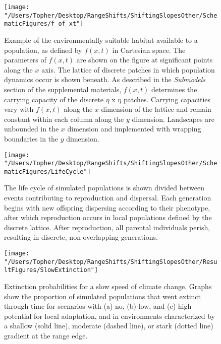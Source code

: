 \documentclass[11pt]{article}
\begin{document}
\begin{figure}[h!]
\texttt{[image: "/Users/Topher/Desktop/RangeShifts/ShiftingSlopesOther/SchematicFigures/f\_of\_xt"]}
\caption{Example of the environmentally suitable habitat available to a population, as defined by $f(x,t)$ in Cartesian space. The parameters of $f(x,t)$ are shown on the figure at significant points along the $x$ axis. The lattice of discrete patches in which population dynamics occur is shown beneath. As described in the \textit{Submodels} section of the supplemental materials, $f(x,t)$ determines the carrying capacity of the discrete $\eta$ x $\eta$ patches. Carrying capacities vary with $f(x,t)$ along the $x$ dimension of the lattice and remain constant within each column along the $y$ dimension. Landscapes are  unbounded in the $x$ dimension and implemented with wrapping boundaries in the $y$ dimension.}
\label{Fig:EnvFunction}
\end{figure}

\clearpage

\begin{figure}[h!]
\texttt{[image: "/Users/Topher/Desktop/RangeShifts/ShiftingSlopesOther/SchematicFigures/LifeCycle"]}
\caption{The life cycle of simulated populations is shown divided between events contributing to reproduction and dispersal. Each generation begins with new offspring dispersing according to their phenotype, after which reproduction occurs in local populations defined by the discrete lattice. After reproduction, all parental individuals perish, resulting in discrete, non-overlapping generations.}
\label{Fig:LifeCycle}
\end{figure}

\clearpage

\renewcommand{\thefigure}{B\arabic{figure}}
\setcounter{figure}{0}

\begin{figure}[h!]
\texttt{[image: "/Users/Topher/Desktop/RangeShifts/ShiftingSlopesOther/ResultFigures/SlowExtinction"]}
\caption{Extinction probabilities for a slow speed of climate change. Graphs show the proportion of simulated populations that went extinct through time for scenarios with (a) no, (b) low, and (c) high potential for local adaptation, and in environments characterized by a shallow (solid line), moderate (dashed line), or stark (dotted line) gradient at the range edge.}
\label{Fig:ExtProbSlow}
\end{figure}

\clearpage
\end{document}
